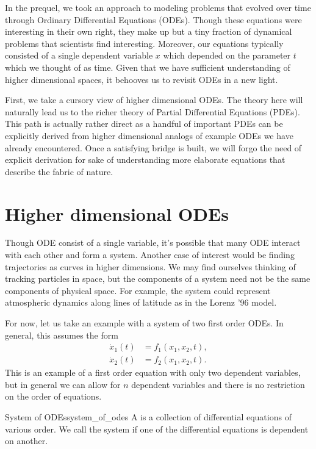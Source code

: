 In the prequel, we took an approach to modeling problems that evolved over time through Ordinary Differential Equations (ODEs). Though these equations were interesting in their own right, they make up but a tiny fraction of dynamical problems that scientists find interesting. Moreover, our equations typically consisted of a single dependent variable $x$ which depended on the parameter $t$ which we thought of as time. Given that we have sufficient understanding of higher dimensional spaces, it behooves us to revisit ODEs in a new light.

First, we take a cursory view of higher dimensional ODEs. The theory here will naturally lead us to the richer theory of Partial Differential Equations (PDEs). This path is actually rather direct as a handful of important PDEs can be explicitly derived from higher dimensional analogs of example ODEs we have already encountered. Once a satisfying bridge is built, we will forgo the need of explicit derivation for sake of understanding more elaborate equations that describe the fabric of nature.


\section{Higher dimensional ODEs}
        Though ODE consist of a single variable, it's possible that many ODE interact with each other and form a system.  Another case of interest would be finding trajectories as curves in higher dimensions. We may find ourselves thinking of tracking particles in space, but the components of a system need not be the same components of physical space. For example, the system could represent atmospheric dynamics along lines of latitude as in the Lorenz '96 model.
        
        For now, let us take an example with a system of two first order ODEs. In general, this assumes the form
        \begin{align}
        \label{eq:system_of_odes1}
            \dot{x}_1(t) &= f_1(x_1,x_2,t),\\
        \label{eq:system_of_odes2}
            \dot{x}_2(t) &= f_2(x_1,x_2,t).
        \end{align}
    This is an example of a first order equation with only two dependent variables, but in general we can allow for $n$ dependent variables and there is no restriction on the order of equations.
        
        \begin{df}{System of ODEs}{system_of_odes}
            A  is a collection of differential equations of various order.  We call the system  if one of the differential equations is dependent on another.
        \end{df}

